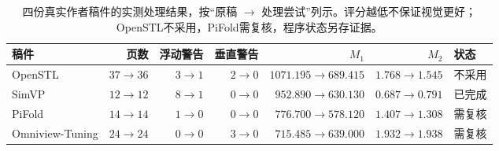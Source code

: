 \begin{table}[!htbp]
\centering
\caption{四份真实作者稿件的实测处理结果，按“原稿 $\to$ 处理尝试”列示。评分越低不保证视觉更好；OpenSTL不采用，PiFold需复核，程序状态另存证据。}
\label{tab:real-case-outcomes}
\small
\setlength{\tabcolsep}{4pt}
\begin{tabular}{@{}lrrrrrl@{}}
\toprule
稿件 & 页数 & 浮动警告 & 垂直警告 & $M_1$ & $M_2$ & 状态 \\
\midrule
OpenSTL & $37\to36$ & $3\to1$ & $2\to0$ & $1071.195\to689.415$ & $1.768\to1.545$ & 不采用 \\
SimVP & $12\to12$ & $8\to1$ & $0\to0$ & $952.890\to630.130$ & $0.687\to0.791$ & 已完成 \\
PiFold & $14\to14$ & $1\to0$ & $0\to0$ & $776.700\to578.120$ & $1.407\to1.308$ & 需复核 \\
Omniview-Tuning & $24\to24$ & $0\to0$ & $3\to0$ & $715.485\to639.000$ & $1.932\to1.938$ & 需复核 \\
\bottomrule
\end{tabular}
\end{table}
